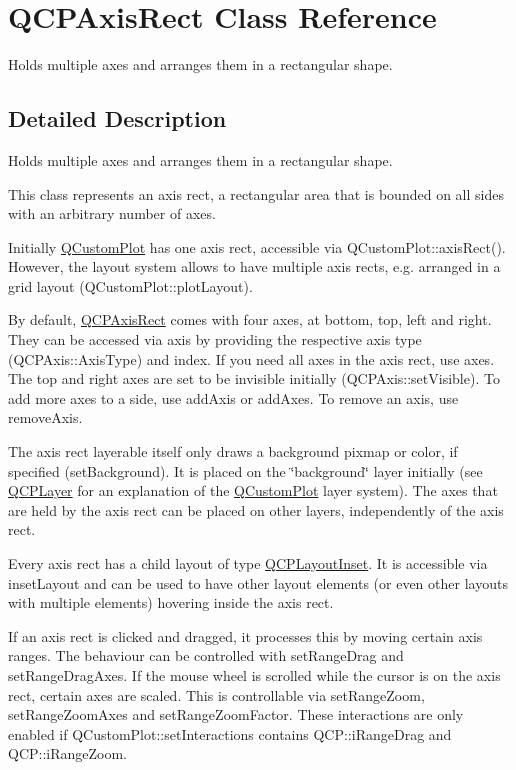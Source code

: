 \hypertarget{class_q_c_p_axis_rect}{}\section{Q\+C\+P\+Axis\+Rect Class Reference}
\label{class_q_c_p_axis_rect}


Holds multiple axes and arranges them in a rectangular shape.  




\subsection{Detailed Description}
Holds multiple axes and arranges them in a rectangular shape. 

This class represents an axis rect, a rectangular area that is bounded on all sides with an arbitrary number of axes.

Initially \mbox{\hyperlink{class_q_custom_plot}{Q\+Custom\+Plot}} has one axis rect, accessible via Q\+Custom\+Plot\+::axis\+Rect(). However, the layout system allows to have multiple axis rects, e.\+g. arranged in a grid layout (Q\+Custom\+Plot\+::plot\+Layout).

By default, \mbox{\hyperlink{class_q_c_p_axis_rect}{Q\+C\+P\+Axis\+Rect}} comes with four axes, at bottom, top, left and right. They can be accessed via axis by providing the respective axis type (Q\+C\+P\+Axis\+::\+Axis\+Type) and index. If you need all axes in the axis rect, use axes. The top and right axes are set to be invisible initially (Q\+C\+P\+Axis\+::set\+Visible). To add more axes to a side, use add\+Axis or add\+Axes. To remove an axis, use remove\+Axis.

The axis rect layerable itself only draws a background pixmap or color, if specified (set\+Background). It is placed on the \char`\"{}background\char`\"{} layer initially (see \mbox{\hyperlink{class_q_c_p_layer}{Q\+C\+P\+Layer}} for an explanation of the \mbox{\hyperlink{class_q_custom_plot}{Q\+Custom\+Plot}} layer system). The axes that are held by the axis rect can be placed on other layers, independently of the axis rect.

Every axis rect has a child layout of type \mbox{\hyperlink{class_q_c_p_layout_inset}{Q\+C\+P\+Layout\+Inset}}. It is accessible via inset\+Layout and can be used to have other layout elements (or even other layouts with multiple elements) hovering inside the axis rect.

If an axis rect is clicked and dragged, it processes this by moving certain axis ranges. The behaviour can be controlled with set\+Range\+Drag and set\+Range\+Drag\+Axes. If the mouse wheel is scrolled while the cursor is on the axis rect, certain axes are scaled. This is controllable via set\+Range\+Zoom, set\+Range\+Zoom\+Axes and set\+Range\+Zoom\+Factor. These interactions are only enabled if Q\+Custom\+Plot\+::set\+Interactions contains Q\+C\+P\+::i\+Range\+Drag and Q\+C\+P\+::i\+Range\+Zoom.

